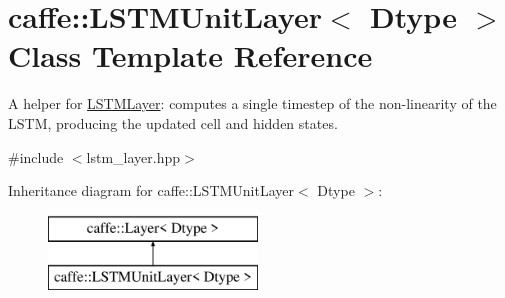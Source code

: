 \hypertarget{classcaffe_1_1LSTMUnitLayer}{}\section{caffe\+:\+:L\+S\+T\+M\+Unit\+Layer$<$ Dtype $>$ Class Template Reference}
\label{classcaffe_1_1LSTMUnitLayer}


A helper for \hyperlink{classcaffe_1_1LSTMLayer}{L\+S\+T\+M\+Layer}\+: computes a single timestep of the non-\/linearity of the L\+S\+TM, producing the updated cell and hidden states.  




{\ttfamily \#include $<$lstm\+\_\+layer.\+hpp$>$}

Inheritance diagram for caffe\+:\+:L\+S\+T\+M\+Unit\+Layer$<$ Dtype $>$\+:\begin{figure}[H]
\begin{center}
\leavevmode
\includegraphics[height=2.000000cm]{classcaffe_1_1LSTMUnitLayer}
\end{center}
\end{figure}
